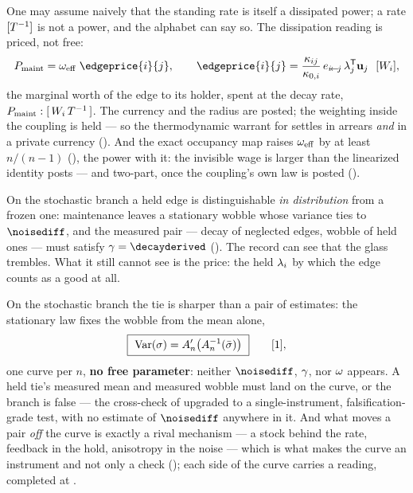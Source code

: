 \documentclass[../main]{subfiles}
\begin{document}
\begin{corollary}
  One may assume naively that the standing rate is itself a dissipated power; a rate
  $[T\sp{-1}]$ is not a power, and the alphabet can say so. The dissipation reading is
  priced, not free:
  \begin{equation}
    P_{\mathrm{maint}}=\willeff\;\edgeprice{i}{j},
    \qquad
    \edgeprice{i}{j}=\frac{\coupling{i}{j}}{\belongingradiusof{i}}\,
      \currency{i}{j}\,\privatewelfare{j}\ \ \dimnodewelfare{i},
    \label{eq:J:power}
  \end{equation}
  the marginal worth of the edge to its holder, spent at the decay rate,
  $P_{\mathrm{maint}}:[\,W\sb{i}\,T\sp{-1}\,]$. The currency and the radius
  are posted; the weighting inside the coupling is held --- so the thermodynamic warrant
  for  settles in arrears \emph{and} in a private currency
  (). And the exact occupancy map raises
  $\omega\sb{\mathrm{eff}}$ by at least $n/(n-1)$ (), the power with it: the
  invisible wage is larger than the linearized identity posts --- and two-part, once
  the coupling's own law is posted ().
\end{corollary}

\begin{corollary}
  On the stochastic branch a held edge is distinguishable \emph{in distribution} from a
  frozen one: maintenance leaves a stationary wobble whose variance ties to $\noisediff$,
  and the measured pair --- decay of neglected edges, wobble of held ones --- must
  satisfy $\decayrate=\decayderived$ (). The record can see that the
  glass trembles. What it still cannot see is the price: the held $\lambda\sb{i}$ by
  which the edge counts as a good at all.
\end{corollary}

\begin{corollary}%
  On the stochastic branch the tie is sharper than a pair of estimates: the stationary
  law fixes the wobble from the mean alone,
  \begin{equation}
    \boxed{\ \operatorname{Var}(\sigma)
      =A\sb{n}'\bigl(A\sb{n}^{-1}(\bar{\sigma})\bigr)\ }
    \qquad[1],
    \label{eq:tremble:curve}
  \end{equation}
  one curve per $n$, \textbf{no free parameter}: neither $\noisediff$, $\gamma$,
  nor $\omega$ appears. A held tie's measured mean and measured wobble must land on the
  curve, or the branch is false --- the cross-check of  upgraded to a
  single-instrument, falsification-grade test, with no estimate of $\noisediff$
  anywhere in it. And what moves a pair \emph{off} the curve is exactly a rival
  mechanism --- a stock behind the rate, feedback in the hold, anisotropy in the noise
  --- which is what makes the curve an instrument and not only a check
  (); each side of the curve carries a reading, completed at
  .
\end{corollary}
\end{document}
